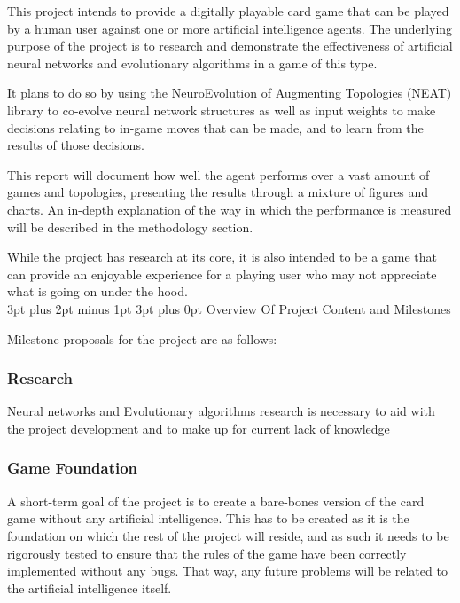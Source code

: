 \documentclass[12pt,a4paper]{article}
\makeatletter
\renewcommand\subsection{\@startsection {subsection}{1}{2mm} %
                               {3pt plus 2pt minus 1pt} %
                               {3pt plus 0pt} %
                               {\normalfont\bfseries}}
\makeatother
\begin{document}
This project intends to provide a digitally playable card game that can be played by a human user against one or more artificial intelligence agents. The underlying purpose of the project is to research and demonstrate the effectiveness of artificial neural networks and evolutionary algorithms in a game of this type. 

It plans to do so by using the NeuroEvolution of Augmenting Topologies (NEAT) library to co-evolve neural network structures as well as input weights to make decisions relating to in-game moves that can be made, and to learn from the results of those decisions. 

This report will document how well the agent performs over a vast amount of games and topologies, presenting the results through a mixture of figures and charts. An in-depth explanation of the way in which the performance is measured will be described in the methodology section. 

While the project has research at its core, it is also intended to be a game that can provide an enjoyable experience for a playing user who may not appreciate what is going on under the hood.\\

 \subsection{Overview Of Project Content and Milestones}

Milestone proposals for the project are as follows: 
\subsubsection{Research}
Neural networks and Evolutionary algorithms research is necessary to aid with the project development and to make up for current lack of knowledge

\subsubsection{Game Foundation}
A short-term goal of the project is to create a bare-bones version of the card game without any artificial intelligence. This has to be created as it is the foundation on which the rest of the project will reside, and as such it needs to be rigorously tested to ensure that the rules of the game have been correctly implemented without any bugs. That way, any future problems will be related to the artificial intelligence itself.
\end{document}
